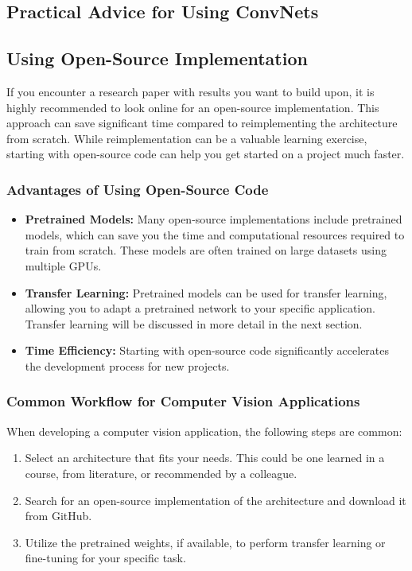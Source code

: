 \documentclass[letterpaper,12pt,notitlepage,twoside]{report}
\begin{document}
\subsection{Practical Advice for Using ConvNets}
\subsection*{Using Open-Source Implementation}
If you encounter a research paper with results you want to build upon, it is highly recommended to look online for an open-source implementation. This approach can save significant time compared to reimplementing the architecture from scratch. While reimplementation can be a valuable learning exercise, starting with open-source code can help you get started on a project much faster.

\subsubsection*{Advantages of Using Open-Source Code}
\begin{itemize}
    \item \textbf{Pretrained Models:} Many open-source implementations include pretrained models, which can save you the time and computational resources required to train from scratch. These models are often trained on large datasets using multiple GPUs.
    \item \textbf{Transfer Learning:} Pretrained models can be used for transfer learning, allowing you to adapt a pretrained network to your specific application. Transfer learning will be discussed in more detail in the next section.
    \item \textbf{Time Efficiency:} Starting with open-source code significantly accelerates the development process for new projects.
\end{itemize}

\subsubsection*{Common Workflow for Computer Vision Applications}
When developing a computer vision application, the following steps are common:
\begin{enumerate}
    \item Select an architecture that fits your needs. This could be one learned in a course, from literature, or recommended by a colleague.
    \item Search for an open-source implementation of the architecture and download it from GitHub.
    \item Utilize the pretrained weights, if available, to perform transfer learning or fine-tuning for your specific task.
\end{enumerate}
\end{document}
